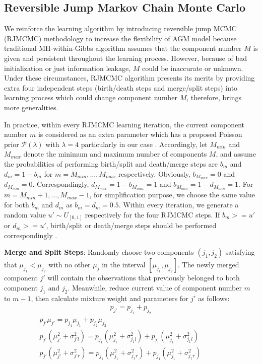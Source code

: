 \subsection{Reversible Jump Markov Chain Monte Carlo}
\label{sec:2.3}

We reinforce the learning algorithm by introducing reversible jump MCMC (RJMCMC) \cite{Bouguila2012} methodology to increase the flexibility of AGM model because traditional MH-within-Gibbs algorithm assumes that the component number $M$ is given and persistent throughout the learning process. However, because of bad initialization or just information leakage, $M$ could be inaccurate or unknown. Under these circumstances, RJMCMC algorithm presents its merits by providing extra four independent steps (birth/death steps and merge/split steps) into learning process which could change component number $M$, therefore, brings more generalities. 

In practice, within every RJMCMC learning iteration, the current component number $m$ is considered as an extra parameter which has a proposed Poisson prior $\mathcal{P}(\lambda)$ with $\lambda = 4$ particularly in our case \cite{Richardson1997}. Accordingly, let $M_{min}$ and $M_{max}$ denote the minimum and maximum number of components $M$, and assume the probabilities of performing birth/split and death/merge steps are $b_m$ and $d_m = 1 - b_m$ for $m = M_{min},\dots,M_{max}$ respectively. Obviously, $b_{M_{max}}=0$ and $d_{M_{min}}=0$. Correspondingly, $d_{M_{max}}=1-b_{M_{max}} = 1$ and $b_{M_{min}}=1-d_{M_{min}}=1$. For $m=M_{min}+1,\dots,M_{max}-1$, for simplification purpose, we choose the same value for both $b_m$ and $d_m$ as $b_m=d_m=0.5$. Within every iteration, we generate a random value $u' \sim U_{[0,1]}$ respectively for the four RJMCMC steps. If $b_m >= u'$ or $d_m >= u'$, birth/split or death/merge steps should be performed correspondingly \cite{Richardson1997}.

\textbf{Merge and Split Steps}: Randomly choose two components $(j_1,j_2)$ satisfying that $\mu_{j_1}<\mu_{j_2}$ with no other $\mu_j$ in the interval $[\mu_{j_1},\mu_{j_2}]$. The newly merged component $j'$ will contain the observations that previously belonged to both component $j_1$ and $j_2$. Meanwhile, reduce current value of component number $m$ to $m-1$, then calculate mixture weight and parameters for $j'$ as follows:
\begin{multline}
\qquad\qquad\qquad\qquad\qquad p_{j'} = p_{j_1}+p_{j_2} \\
p_{j'}\mu_{j'} = p_{j_1}\mu_{j_1} + p_{j_2}\mu_{j_2} \qquad\quad\\
p_{j'}(\mu_{j'}^2 + \sigma_{j'l}^2) = p_{j_1}(\mu_{j_1}^2 + \sigma_{j_1l}^2) + p_{j_1}(\mu_{j_1}^2 + \sigma_{j_1l}^2) \\
p_{j'}(\mu_{j'}^2 + \sigma_{j'r}^2) = p_{j_1}(\mu_{j_1}^2 + \sigma_{j_1r}^2)+p_{j_1}(\mu_{j_1}^2 + \sigma_{j_1r}^2)\qquad\quad
\label{eq:merge}
\end{multline}

